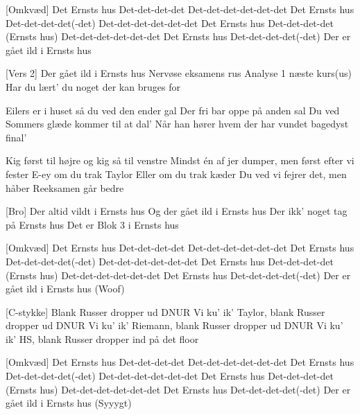 \documentclass[a4paper,11pt]{article}
\begin{document}
\begin{song}
[Omkvæd] Det Ernsts hus
Det-det-det-det
Det-det-det-det-det-det
Det Ernsts hus
Det-det-det-det(-det)
Det-det-det-det-det-det
Det Ernsts hus
Det-det-det-det (Ernsts hus)
Det-det-det-det-det-det
Det Ernsts hus
Det-det-det-det(-det)
Der er gået ild i Ernsts hus

[Vers 2] Der gået ild i Ernsts hus
Nervøse eksamens rus
Analyse 1 næste kurs(us)
Har du lært’ du noget der kan bruges for

 Eilers er i huset så du ved den ender gal
Der fri bar oppe på anden sal
Du ved Sommers glæde kommer til at dal'
Når han hører hvem der har vundet bagedyst final'

 Kig først til højre og kig så til venstre
Mindst én af jer dumper, men først efter vi fester
E-ey om du trak Taylor
Eller om du trak kæder
Du ved vi fejrer det, men håber
Reeksamen går bedre

[Bro] Der altid vildt i Ernsts hus
 Og der gået ild i Ernsts hus
 Der ikk’ noget tag på Ernsts hus
Det er Blok 3 i Ernsts hus

[Omkvæd] Det Ernsts hus
Det-det-det-det
Det-det-det-det-det-det
Det Ernsts hus
Det-det-det-det(-det)
Det-det-det-det-det-det
Det Ernsts hus
Det-det-det-det (Ernsts hus)
Det-det-det-det-det-det
Det Ernsts hus
Det-det-det-det(-det)
Der er gået ild i Ernsts hus (Woof)

[C-stykke] Blank
Russer dropper ud DNUR
Vi ku’ ik’ Taylor, blank
Russer dropper ud DNUR
Vi ku’ ik’ Riemann, blank
Russer dropper ud DNUR
Vi ku’ ik’ HS, blank
Russer dropper ind på det floor

[Omkvæd] Det Ernsts hus
Det-det-det-det
Det-det-det-det-det-det
Det Ernsts hus
Det-det-det-det(-det)
Det-det-det-det-det-det
Det Ernsts hus
Det-det-det-det (Ernsts hus)
Det-det-det-det-det-det
Det Ernsts hus
Det-det-det-det(-det)
Der er gået ild i Ernsts hus (Syyygt)
\end{song}
\end{document}
